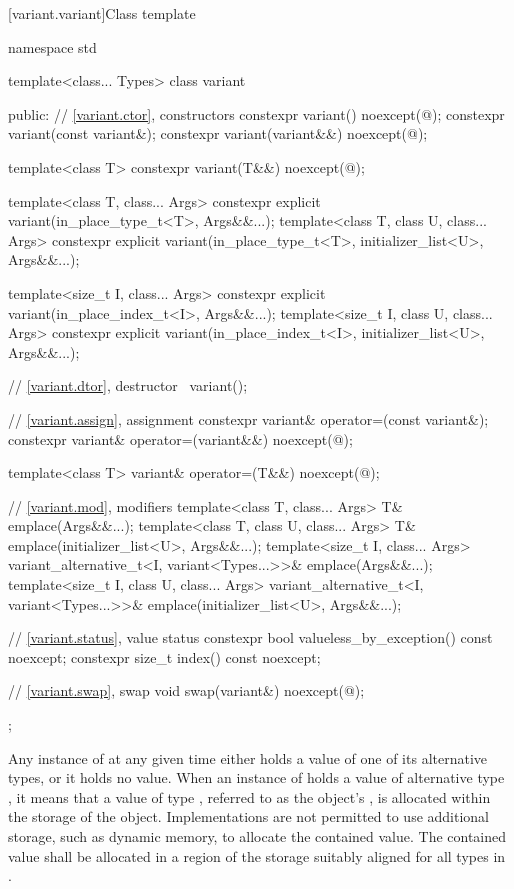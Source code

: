 %
[variant.variant]{Class template }

\begin{codeblock}
namespace std {
  template<class... Types>
  class variant {
  public:
    // \ref{variant.ctor}, constructors
    constexpr variant() noexcept(@\seebelow@);
    constexpr variant(const variant&);
    constexpr variant(variant&&) noexcept(@\seebelow@);

    template<class T>
      constexpr variant(T&&) noexcept(@\seebelow@);

    template<class T, class... Args>
      constexpr explicit variant(in_place_type_t<T>, Args&&...);
    template<class T, class U, class... Args>
      constexpr explicit variant(in_place_type_t<T>, initializer_list<U>, Args&&...);

    template<size_t I, class... Args>
      constexpr explicit variant(in_place_index_t<I>, Args&&...);
    template<size_t I, class U, class... Args>
      constexpr explicit variant(in_place_index_t<I>, initializer_list<U>, Args&&...);

    // \ref{variant.dtor}, destructor
    ~variant();

    // \ref{variant.assign}, assignment
    constexpr variant& operator=(const variant&);
    constexpr variant& operator=(variant&&) noexcept(@\seebelow@);

    template<class T> variant& operator=(T&&) noexcept(@\seebelow@);

    // \ref{variant.mod}, modifiers
    template<class T, class... Args>
      T& emplace(Args&&...);
    template<class T, class U, class... Args>
      T& emplace(initializer_list<U>, Args&&...);
    template<size_t I, class... Args>
      variant_alternative_t<I, variant<Types...>>& emplace(Args&&...);
    template<size_t I, class U, class... Args>
      variant_alternative_t<I, variant<Types...>>& emplace(initializer_list<U>, Args&&...);

    // \ref{variant.status}, value status
    constexpr bool valueless_by_exception() const noexcept;
    constexpr size_t index() const noexcept;

    // \ref{variant.swap}, swap
    void swap(variant&) noexcept(@\seebelow@);
  };
}
\end{codeblock}

\pnum
Any instance of  at any given time either holds a value
of one of its alternative types, or it holds no value.
When an instance of  holds a value of alternative type ,
it means that a value of type , referred to as the 
object's , is allocated within the storage of the
 object.
Implementations are not permitted to use additional storage, such as dynamic
memory, to allocate the contained value.
The contained value shall be allocated in a region of the 
storage suitably aligned for all types in .

